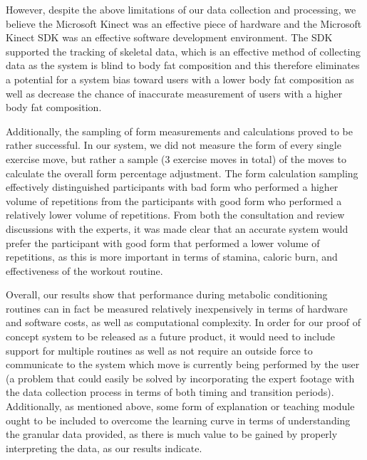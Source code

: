 However, despite the above limitations of our data collection and processing, we believe the Microsoft Kinect was an effective piece of hardware and the Microsoft Kinect SDK was an effective software development environment.  The SDK supported the tracking of skeletal data, which is an effective method of collecting data as the system is blind to body fat composition and this therefore eliminates a potential for a system bias toward users with a lower body fat composition as well as decrease the chance of inaccurate measurement of users with a higher body fat composition.

Additionally, the sampling of form measurements and calculations proved to be rather successful.  In our system, we did not measure the form of every single exercise move, but rather a sample (3 exercise moves in total) of the moves to calculate the overall form percentage adjustment.  The form calculation sampling effectively distinguished participants with bad form who performed a higher volume of repetitions from the participants with good form who performed a relatively lower volume of repetitions.  From both the consultation and review discussions with the experts, it was made clear that an accurate system would prefer the participant with good form that performed a lower volume of repetitions, as this is more important in terms of stamina, caloric burn, and effectiveness of the workout routine.

Overall, our results show that performance during metabolic conditioning routines can in fact be measured relatively inexpensively in terms of hardware and software costs, as well as computational complexity.  In order for our proof of concept system to be released as a future product, it would need to include support for multiple routines as well as not require an outside force to communicate to the system which move is currently being performed by the user (a problem that could easily be solved by incorporating the expert footage with the data collection process in terms of both timing and transition periods).  Additionally, as mentioned above, some form of explanation or teaching module ought to be included to overcome the learning curve in terms of understanding the granular data provided, as there is much value to be gained by properly interpreting the data, as our results indicate.
